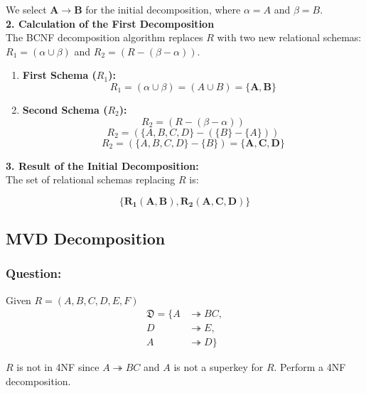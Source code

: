 \documentclass{article}
\begin{document}
We select $\mathbf{A \rightarrow B}$ for the initial decomposition, where $\alpha=A$ and $\beta=B$. \\

\textbf{2. Calculation of the First Decomposition} \\

The BCNF decomposition algorithm replaces $R$ with two new relational schemas: $R_1 = (\alpha \cup \beta)$ and $R_2 = (R - (\beta - \alpha))$.

\begin{enumerate}
    \item \textbf{First Schema ($R_1$):}
    $$R_1 = (\alpha \cup \beta) = (A \cup B) = \mathbf{\{A, B\}}$$

    \item \textbf{Second Schema ($R_2$):}
    $$R_2 = (R - (\beta - \alpha))$$
    $$R_2 = (\{A, B, C, D\} - (\{B\} - \{A\}))$$
    $$R_2 = (\{A, B, C, D\} - \{B\}) = \mathbf{\{A, C, D\}}$$
\end{enumerate}

\textbf{3. Result of the Initial Decomposition:} \\

The set of relational schemas replacing $R$ is:

$$\mathbf{\{R_1(A, B), R_2(A, C, D)\}}$$

\subsection{MVD Decomposition}

\subsubsection*{Question:}
Given $R = (A, B, C, D, E, F)$ \\

\begin{equation*}
    \begin{align*}
        \mathfrak{D} = \{ A &\twoheadrightarrow BC, \\
                D &\twoheadrightarrow E, \\
                A &\twoheadrightarrow D \}
    \end{align*}
\end{equation*}

$R$ is not in 4NF since $A \twoheadrightarrow BC$ and $A$ is not a superkey for $R$. Perform a 4NF decomposition.
\end{document}
